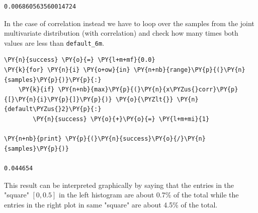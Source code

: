 \begin{Answer}
\begin{codebox}[size=fbox, boxrule=1pt, colback=cellbackground, colframe=cellborder]
\begin{Verbatim}[commandchars=\\\{\}]
0.006860563560014724
\end{Verbatim}
\end{codebox}

In the case of correlation instead we have to loop over the samples from the joint multivariate distribution (with correlation) and check how many times both values are less than \texttt{default\_6m}.

\begin{codebox}[size=fbox, boxrule=1pt, colback=cellbackground, colframe=cellborder]
\begin{Verbatim}[commandchars=\\\{\}]
\PY{n}{success} \PY{o}{=} \PY{l+m+mf}{0.0}
\PY{k}{for} \PY{n}{i} \PY{o+ow}{in} \PY{n+nb}{range}\PY{p}{(}\PY{n}{samples}\PY{p}{)}\PY{p}{:}
    \PY{k}{if} \PY{n+nb}{max}\PY{p}{(}\PY{n}{x\PYZus{}corr}\PY{p}{[}\PY{n}{i}\PY{p}{]}\PY{p}{)} \PY{o}{\PYZlt{}} \PY{n}{default\PYZus{}2}\PY{p}{:}
        \PY{n}{success} \PY{o}{+}\PY{o}{=} \PY{l+m+mi}{1}
		
\PY{n+nb}{print} \PY{p}{(}\PY{n}{success}\PY{o}{/}\PY{n}{samples}\PY{p}{)}

0.044654
\end{Verbatim}
\end{codebox}

This result can be interpreted graphically by saying that the entries in the "square" $[0, 0.5]$ in the left histogram are about 0.7\% of the total while the entries in the right plot in same "square" are about 4.5\% of the total. 
\end{Answer}